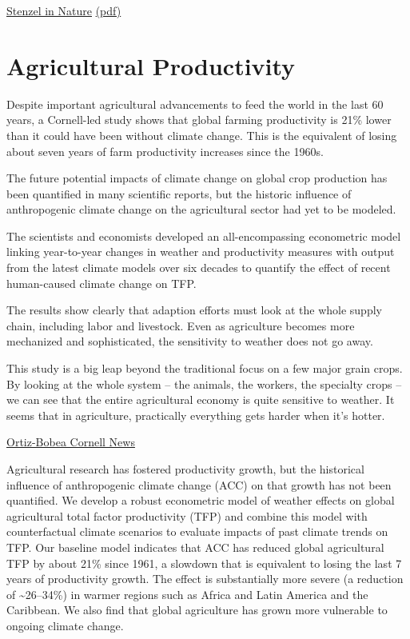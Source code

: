 \documentclass[
]{book}
\begin{document}
\href{https://www.nature.com/articles/s41467-021-21640-3}{Stenzel in Nature}
\href{pdf/Stenzel_2021_Biomass_Plantation_Water_Stress.pdf}{(pdf)}

\hypertarget{agricultural-productivity}{%
\section{Agricultural Productivity}\label{agricultural-productivity}}

Despite important agricultural advancements to feed the world in the last 60 years, a Cornell-led study shows that global farming productivity is 21\% lower than it could have been without climate change. This is the equivalent of losing about seven years of farm productivity increases since the 1960s.

The future potential impacts of climate change on global crop production has been quantified in many scientific reports, but the historic influence of anthropogenic climate change on the agricultural sector had yet to be modeled.

The scientists and economists developed an all-encompassing econometric model linking year-to-year changes in weather and productivity measures with output from the latest climate models over six decades to quantify the effect of recent human-caused climate change on TFP.

The results show clearly that adaption efforts must look at the whole supply chain, including labor and livestock.
Even as agriculture becomes more mechanized and sophisticated, the sensitivity to weather does not go away.

This study is a big leap beyond the traditional focus on a few major grain crops.
By looking at the whole system -- the animals, the workers, the specialty crops -- we can see that the entire agricultural economy is quite sensitive to weather. It seems that in agriculture, practically everything gets harder when it's hotter.

\href{https://news.cornell.edu/stories/2021/04/climate-change-has-cost-7-years-ag-productivity-growth}{Ortiz-Bobea Cornell News}

Agricultural research has fostered productivity growth, but the historical influence of anthropogenic climate change (ACC) on that growth has not been quantified. We develop a robust econometric model of weather effects on global agricultural total factor productivity (TFP) and combine this model with counterfactual climate scenarios to evaluate impacts of past climate trends on TFP. Our baseline model indicates that ACC has reduced global agricultural TFP by about 21\% since 1961, a slowdown that is equivalent to losing the last 7 years of productivity growth. The effect is substantially more severe (a reduction of \textasciitilde26--34\%) in warmer regions such as Africa and Latin America and the Caribbean. We also find that global agriculture has grown more vulnerable to ongoing climate change.
\end{document}
